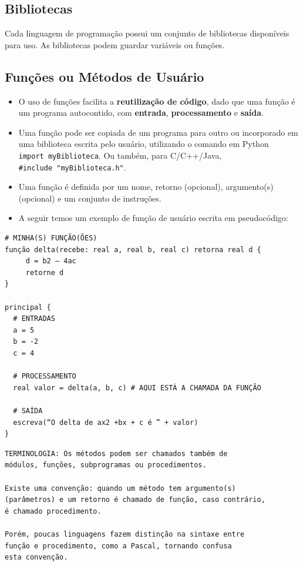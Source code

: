 \documentclass[12pt,a4paper]{article}
\begin{document}
    \hypertarget{bibliotecas}{%
\subsection{Bibliotecas}\label{bibliotecas}}

    Cada linguagem de programação possui um conjunto de bibliotecas
disponíveis para uso. As bibliotecas podem guardar variáveis ou funções.

    \hypertarget{funuxe7uxf5es-ou-muxe9todos-de-usuuxe1rio}{%
\subsection{Funções ou Métodos de
Usuário}\label{funuxe7uxf5es-ou-muxe9todos-de-usuuxe1rio}}

    \begin{itemize}
\item
  O uso de funções facilita a \textbf{reutilização de código}, dado que
  uma função é um programa autocontido, com \textbf{entrada},
  \textbf{processamento} e \textbf{saída}.
\item
  Uma função pode ser copiada de um programa para outro ou incorporado
  em uma biblioteca escrita pelo usuário, utilizando o comando em Python
  \texttt{import\ myBiblioteca}. Ou também, para C/C++/Java,
  \texttt{\#include\ "myBiblioteca.h"}.
\item
  Uma função é definida por um nome, retorno (opcional), argumento(s)
  (opcional) e um conjunto de instruções.
\item
  A seguir temos um exemplo de função de usuário escrita em
  pseudocódigo:
\end{itemize}

    \begin{verbatim}
# MINHA(S) FUNÇÃO(ÕES)
função delta(recebe: real a, real b, real c) retorna real d {
     d = b2 – 4ac
     retorne d
}

principal {
  # ENTRADAS
  a = 5
  b = -2
  c = 4

  # PROCESSAMENTO
  real valor = delta(a, b, c) # AQUI ESTÁ A CHAMADA DA FUNÇÃO
  
  # SAÍDA
  escreva(“O delta de ax2 +bx + c é ” + valor)
}
\end{verbatim}

    \begin{verbatim}
TERMINOLOGIA: Os métodos podem ser chamados também de 
módulos, funções, subprogramas ou procedimentos. 

Existe uma convenção: quando um método tem argumento(s) 
(parâmetros) e um retorno é chamado de função, caso contrário, 
é chamado procedimento. 

Porém, poucas linguagens fazem distinção na sintaxe entre 
função e procedimento, como a Pascal, tornando confusa 
esta convenção. 
\end{verbatim}
\end{document}
